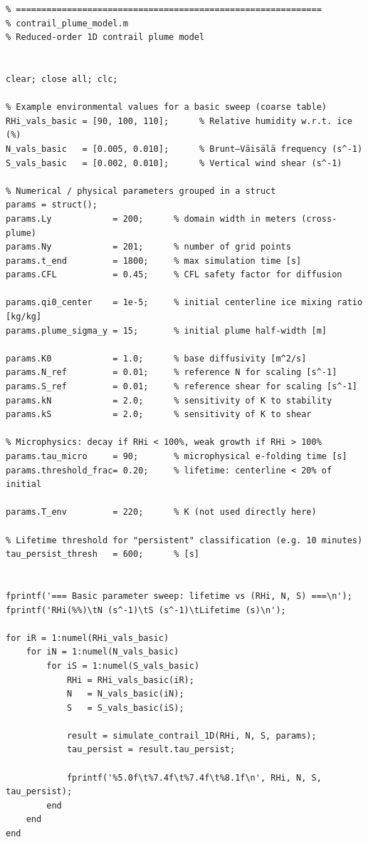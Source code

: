 \documentclass[11pt]{article}
\begin{document}
\begin{verbatim}
% ============================================================
% contrail_plume_model.m
% Reduced-order 1D contrail plume model


clear; close all; clc;

% Example environmental values for a basic sweep (coarse table)
RHi_vals_basic = [90, 100, 110];      % Relative humidity w.r.t. ice (%)
N_vals_basic   = [0.005, 0.010];      % Brunt–Väisälä frequency (s^-1)
S_vals_basic   = [0.002, 0.010];      % Vertical wind shear (s^-1)

% Numerical / physical parameters grouped in a struct
params = struct();
params.Ly            = 200;      % domain width in meters (cross-plume)
params.Ny            = 201;      % number of grid points
params.t_end         = 1800;     % max simulation time [s]
params.CFL           = 0.45;     % CFL safety factor for diffusion

params.qi0_center    = 1e-5;     % initial centerline ice mixing ratio [kg/kg]
params.plume_sigma_y = 15;       % initial plume half-width [m]

params.K0            = 1.0;      % base diffusivity [m^2/s]
params.N_ref         = 0.01;     % reference N for scaling [s^-1]
params.S_ref         = 0.01;     % reference shear for scaling [s^-1]
params.kN            = 2.0;      % sensitivity of K to stability
params.kS            = 2.0;      % sensitivity of K to shear

% Microphysics: decay if RHi < 100%, weak growth if RHi > 100%
params.tau_micro     = 90;       % microphysical e-folding time [s]
params.threshold_frac= 0.20;     % lifetime: centerline < 20% of initial

params.T_env         = 220;      % K (not used directly here)

% Lifetime threshold for "persistent" classification (e.g. 10 minutes)
tau_persist_thresh   = 600;      % [s]


fprintf('=== Basic parameter sweep: lifetime vs (RHi, N, S) ===\n');
fprintf('RHi(%%)\tN (s^-1)\tS (s^-1)\tLifetime (s)\n');

for iR = 1:numel(RHi_vals_basic)
    for iN = 1:numel(N_vals_basic)
        for iS = 1:numel(S_vals_basic)
            RHi = RHi_vals_basic(iR);
            N   = N_vals_basic(iN);
            S   = S_vals_basic(iS);

            result = simulate_contrail_1D(RHi, N, S, params);
            tau_persist = result.tau_persist;

            fprintf('%5.0f\t%7.4f\t%7.4f\t%8.1f\n', RHi, N, S, tau_persist);
        end
    end
end



\end{verbatim}
\end{document}
